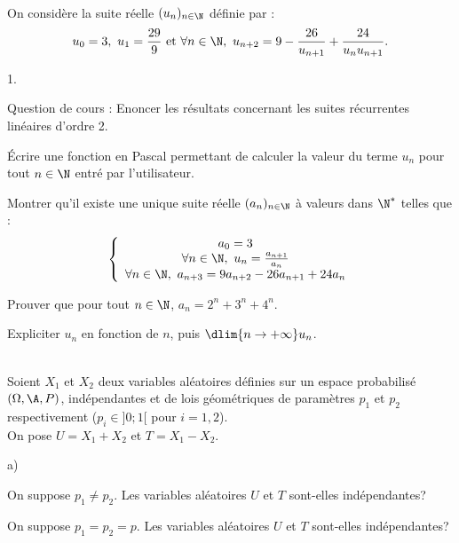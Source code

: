 \documentclass[11pt]{article}%
\begin{document}
\newpage


\begin{exerciceAP}~\\
  On considère la suite réelle $(u_n)_{n \in \N}$ définie par : 
  \[
  u_0 = 3,\ u_1 = \frac{29}{9} \text{ et } \forall n \in \N,\ u_{n+2}
  = 9 - \frac{26}{u_{n+1}} + \frac{24}{u_n u_{n+1}}.
  \]
  \begin{noliste}{1.}
    \setlength{\itemsep}{2mm}
  \item Question de cours : Enoncer les résultats concernant les
    suites récurrentes linéaires d'ordre 2.

  \item Écrire une fonction en Pascal permettant de calculer la valeur
    du terme $u_n$ pour tout $n \in \N$ entré par l'utilisateur.

  \item Montrer qu'il existe une unique suite réelle $(a_n)_{n \in
      \N}$ à valeurs dans $\N^*$ telles que :
    \[
    \left\{ \begin{array}{c}
        a_0 = 3 \\
        \forall n \in \N,\ u_n = \frac{a_{n+1}}{a_n} \\
        \forall n \in \N,\ a_{n+3} = 9 a_{n+2} - 26 a_{n+1} + 24 a_n
      \end{array} 
    \right.
    \]
  \item Prouver que pour tout $n \in \N$, $a_n = 2^n + 3^n + 4^n$.
  \item Expliciter $u_n$ en fonction de $n$, puis $\dlim{n \rightarrow
      +\infty} u_n$.
  \end{noliste}
\end{exerciceAP}


\begin{exerciceSP}~\\
  Soient $X_1$ et $X_2$ deux variables aléatoires définies sur un
  espace probabilisé $(\Omega , \A , P)$, indépendantes et de lois
  géométriques de paramètres $p_1$ et $p_2$ respectivement ($p_i \in
  ]0 ; 1[$ pour $i = 1,2$). \\
  On pose $U = X_1 + X_2$ et $T = X_1 - X_2$.
  \begin{noliste}{a)}
    \setlength{\itemsep}{2mm}
  \item On suppose $p_1 \neq p_2$. Les variables aléatoires $U$ et $T$
    sont-elles indépendantes?
  \item On suppose $p_1 = p_2 = p$. Les variables aléatoires $U$ et
    $T$ sont-elles indépendantes?
  \end{noliste}
\end{exerciceSP}
\end{document}
